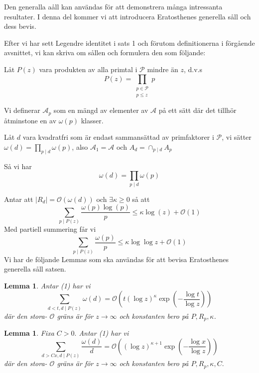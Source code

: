 \documentclass[12pt,a4paper]{article}
\newcommand{\divides}{\mid}
\newcommand{\A}{\mathcal{A}}
\renewcommand{\P}{\mathcal{P}}
\newtheorem{lemma}[theorem]{Lemma}
\begin{document}
Den generalla aåll kan användas för att demonstrera många intressanta resultater. I denna del kommer vi att introducera Eratosthenes generella såll och dess bevis.

Efter vi har sett Legendre identitet i sats 1 och förutom definitionerna i förgående avsnittet, vi kan skriva om sållen och formulera den som följande:


Låt $ P(z) $ vara produkten av alla primtal i $ \P $ mindre än $ z $, d.v.s
\[P(z)=\prod_{\substack{p \in \P\\ p \leq z}} p \]

Vi definerar $\A_{p}$ som en mängd av elementer av $ \A $ på ett sätt där det tillhör åtminstone en av $\omega(p)$ klasser.

Låt $ d $ vara kvadratfri som är endast sammansättad av primfaktorer i $ \P $, vi sätter $\omega(d)=\prod_{p \divides d} \omega(p)$, also $\A_{1} =\A$ och $A_{d}=\cap_{p \divides d} A_{p}$

Så vi har
\[\omega(d)=\prod_{p\divides d}\omega(p)\]



Antar att $ \vert R_{d}\vert=\mathcal{O}(\omega(d))$ och $ \exists\kappa\geq 0 $ så att
\begin{equation}
\sum_{p\divides P(z)}\frac{\omega(p)\log(p)}{p}\leq \kappa \log(z)+\mathcal{O}(1)
\end{equation}  
Med partiell summering får vi
\[\sum_{p\divides P(z)}\frac{\omega(p)}{p}\leq\kappa\log\log z+\mathcal{O}(1)\]
   Vi har de följande Lemmas som ska användas för att bevisa Eratosthenes generella såll satsen.
\begin{lemma}
     Antar (1) har vi
$$
\sum_{d<t, d \divides P(z)} \omega(d)=\mathcal{O}\left(t(\log z)^{\kappa} \exp \left(-\frac{\log t}{\log z}\right)\right)
$$
där den stora- $\mathcal{O}$ gräns är för $z \rightarrow \infty$ och konstanten bero på $P, R_{p}, \kappa$.
\end{lemma}
\begin{lemma}
    Fixa $C>0 .$ Antar (1) har vi
$$
\sum_{d>C x, d \divides P(z)} \frac{\omega(d)}{d}=\mathcal{O}\left((\log z)^{\kappa+1} \exp \left(-\frac{\log x}{\log z}\right)\right)
$$
där den stora- $\mathcal{O}$ gräns är för $z \rightarrow \infty$ och konstanten bero på $P, R_{p}, \kappa, C .$
 
\end{lemma}
\end{document}

